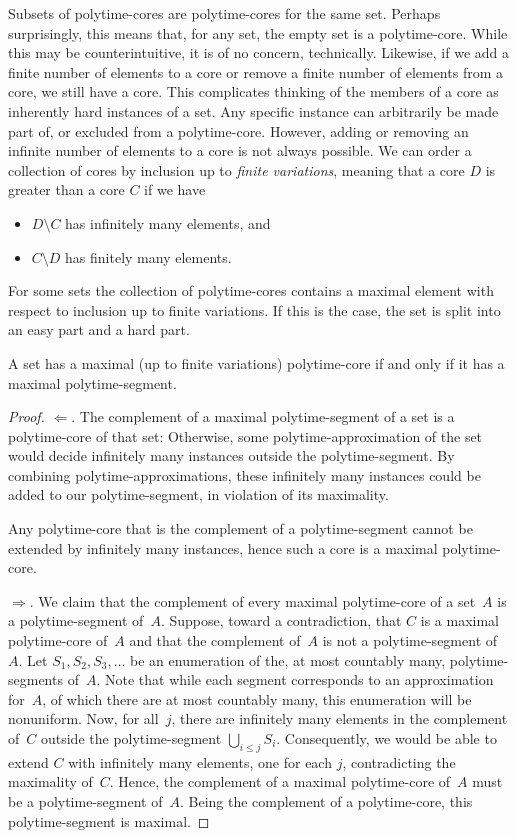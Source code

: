 Subsets of polytime-cores are polytime-cores for the same set.
Perhaps surprisingly, this means that, for any set, the empty set is a polytime-core.
While this may be counterintuitive, it is of no concern, technically.
Likewise, if we add a finite number of elements to a core or remove a finite number of elements from a core, we still have a core.
This complicates thinking of the members of a core as inherently hard instances of a set.
Any specific instance can arbitrarily be made part of, or excluded from a polytime-core.
However, adding or removing an infinite number of elements to a core is not always possible.
We can order a collection of cores by inclusion up to \emph{finite variations}, meaning that a core $D$ is greater than a core $C$ if we have
\begin{itemize}
\item $D \setminus C$ has infinitely many elements, and
\item $C \setminus D$ has finitely many elements.
\end{itemize}
For some sets the collection of polytime-cores contains a maximal element with respect to inclusion up to finite variations.
If this is the case, the set is split into an easy part and a hard part.
\begin{theorem}
\label{thm:maximal}%
  A set has a maximal (up to finite variations) polytime-core if and only if it has a maximal polytime-segment.
\end{theorem}
\begin{proof}
  $\Longleftarrow$.
  The complement of a maximal polytime-segment of a set is a polytime-core of that set:
  Otherwise, some polytime-approximation of the set would decide infinitely many instances outside the polytime-segment.
  By combining polytime-approximations, these infinitely many instances could be added to our polytime-segment, in violation of its maximality.

  Any polytime-core that is the complement of a polytime-segment cannot be extended by infinitely many instances, hence such a core is a maximal polytime-core.

  $\Longrightarrow$.
  We claim that the complement of every maximal polytime-core of a set~$A$ is a polytime-segment of~$A$.
  Suppose, toward a contradiction, that $C$ is a maximal polytime-core of~$A$ and that the complement of~$A$ is not a polytime-segment of~$A$.
  Let $S_1, S_2, S_3, \ldots$ be an enumeration of the, at most countably many, polytime-segments of~$A$.
  Note that while each segment corresponds to an approximation for~$A$, of which there are at most countably many, this enumeration will be nonuniform.
  Now, for all~$j$, there are infinitely many elements in the complement of~$C$ outside the polytime-segment $\bigcup_{i \le j} S_i$.
  Consequently, we would be able to extend $C$ with infinitely many elements, one for each $j$, contradicting the maximality of~$C$.
  Hence, the complement of a maximal polytime-core of~$A$ must be a polytime-segment of~$A$.
  Being the complement of a polytime-core, this polytime-segment is maximal.
\end{proof}

